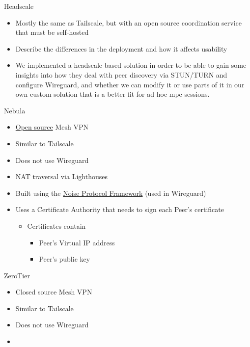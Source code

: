 \label{notes__02053-headscale.md}
\begin{block}{Headscale}
\label{notes__02053-headscale.md__headscale}
\begin{itemize}
\tightlist
\item
  Mostly the same as Tailscale, but with an open source coordination service that must be self-hosted
\item
  Describe the differences in the deployment and how it affects usability
\item
  We implemented a headscale based solution in order to be able to gain some insights into how they deal with peer discovery via STUN/TURN and configure Wireguard, and whether we can modify it or use parts of it in our own custom solution that is a better fit for ad hoc mpc sessions.
\end{itemize}
\end{block}

\label{notes__02054-nebula.md}
\begin{block}{Nebula}
\label{notes__02054-nebula.md__nebula}
\begin{itemize}
\tightlist
\item
  \href{https://github.com/slackhq/nebula}{Open source} Mesh VPN
\item
  Similar to Tailscale
\item
  Does not use Wireguard
\item
  NAT traversal via Lighthouses
\item
  Built using the \href{notes/02022-noise}{Noise Protocol Framework} (used in Wireguard)
\item
  Uses a Certificate Authority that needs to sign each Peer's certificate

  \begin{itemize}
  \tightlist
  \item
    Certificates contain

    \begin{itemize}
    \tightlist
    \item
      Peer's Virtual IP address
    \item
      Peer's public key
    \end{itemize}
  \end{itemize}
\end{itemize}
\end{block}

\label{notes__02055-zero-tier.md}
\begin{block}{ZeroTier}
\label{notes__02055-zero-tier.md__zerotier}
\begin{itemize}
\tightlist
\item
  Closed source Mesh VPN
\item
  Similar to Tailscale
\item
  Does not use Wireguard
\item
\end{itemize}
\end{block}

